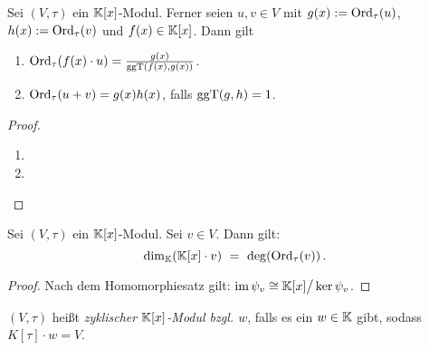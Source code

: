 \begin{lemma}
  \label{lemma:eigenschaften_tau_ordnung}
  Sei $(V,\tau)$ ein $\mathbb{K}[x]$-Modul. Ferner seien
  $u,v\in V$ mit $g(x) := \operatorname{Ord}_\tau(u)$, $h(x) := \operatorname{Ord}_\tau(v)$ und 
  $f(x) \in \mathbb{K}[x]$. Dann gilt
  \begin{enumerate}
    \item $\operatorname{Ord}_\tau(f(x)\cdot u) = \frac{g(x)}{\operatorname{ggT}(f(x),g(x))}$.
    \item $\operatorname{Ord}_\tau(u+v) = g(x)h(x)$, falls $\operatorname{ggT}(g,h) = 1$.
  \end{enumerate}
\end{lemma}
\begin{proof}
  \begin{enumerate}
    \item \TODO
    \item \TODO
  \end{enumerate}
\end{proof}

\begin{lemma}
  Sei $(V,\tau)$ ein $\mathbb{K}[x]$-Modul. Sei $v\in V$. Dann gilt:
  \[ \dim_\mathbb{K}( \mathbb{K}[x]\cdot v ) \ =\  \deg( \operatorname{Ord}_\tau(v) )\,.\]
\end{lemma}
\begin{proof}
  Nach dem Homomorphiesatz gilt: 
  $ \operatorname{im}\psi_v \cong \mathbb{K}[x] \big/ \ker \psi_v$.
\end{proof}


\begin{definition}
  $(V,\tau)$ heißt \emph{zyklischer $\mathbb{K}[x]$-Modul bzgl. $w$}, falls es ein 
  $w\in \mathbb{K}$ gibt, sodass $K[\tau]\cdot w = V$.
\end{definition}


